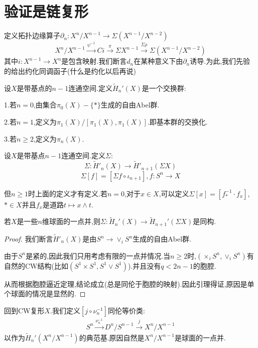 \section{验证是链复形}
定义拓扑边缘算子$\partial_n:X^n/X^{n-1}\to \Sigma(X^{n-1}/X^{n-2})$
$$
X^n/X^{n-1} \stackrel{\psi^{-1}}{\rightarrow} Ci \stackrel{\pi}{\rightarrow} \Sigma X^{n-1} \stackrel{\Sigma \rho}{\rightarrow}\Sigma(X^{n-1}/X^{n-2}) 
$$
其中$i:X^{n-1}\to X^n$是包含映射.我们断言$d_n$在某种意义下由$\partial_n$诱导.为此,我们先验的给出约化同调函子(什么是约化以后再说)
\begin{definition}
    设$X$是带基点的$n-1$连通空间.定义$\tilde{H}_n'(X)$是一个交换群:

    1.若$n=0$,由集合$\pi_0(X)-\{*\}$生成的自由Abel群.

    2.若$n=1$,定义为$\pi_1(X)/[\pi_1(X),\pi_1(X)]$.即基本群的交换化.

    3.若$n\geq 2$,定义为$\pi_n(X)$.
\end{definition}
\begin{definition}
    设$X$是带基点$n-1$连通空间.定义$\Sigma$:
    $$
    \Sigma:\tilde{H}'_n(X)\to \tilde{H}'_{n+1}(\Sigma X)
    $$
    $$
    \Sigma[f]=[\Sigma f \circ \iota_{n+1}],f:S^n \to X
    $$

    但$n\geq 1$时上面的定义才有定义.若$n=0$,对于$x \in X$,可以定义$\Sigma[x]=[f_*^{-1}\cdot f_x]$,$* \in X$并且$f_x$是道路$t \mapsto x\wedge t$.
\end{definition}
\begin{lemma}
    若$X$是一些$n$维球面的一点并,则$\Sigma:\tilde{H}_n'(X)\to \tilde{H}_{n+1}'(\Sigma  X)$是同构.
\end{lemma}
\begin{proof}
    我们断言$\tilde{H}'_n(X)$是由$S^n \to \vee_i S^n$生成的自由Abel群.

    由于$S^n$是紧的,因此我们只用考虑有限的一点并情况.当$n\geq 2$时,$(\times_i S^n,\vee_i S^n)$有自然的CW结构(比如$(S^1\times S^1,S^1\vee S^1)$).并且没有$q<2n-1$的胞腔.

    从而根据胞腔逼近定理,结论成立(总是同伦于胞腔的映射).因此引理得证,原因是单个球面的情况是显然的.
\end{proof}
回到CW复形$X$.我们定义$[j\circ \nu_n^{-1}]$同伦等价类:
\begin{align*}
    S^n \stackrel{\nu_n^{-1}}{\longrightarrow}D^n/S^{n-1} \stackrel{j}{\longrightarrow} X^n/X^{n-1}
\end{align*}
以作为$\tilde{H}_n'(X^n/X^{n-1})$的典范基.原因自然是$X^n/X^{n-1}$是球面的一点并.

